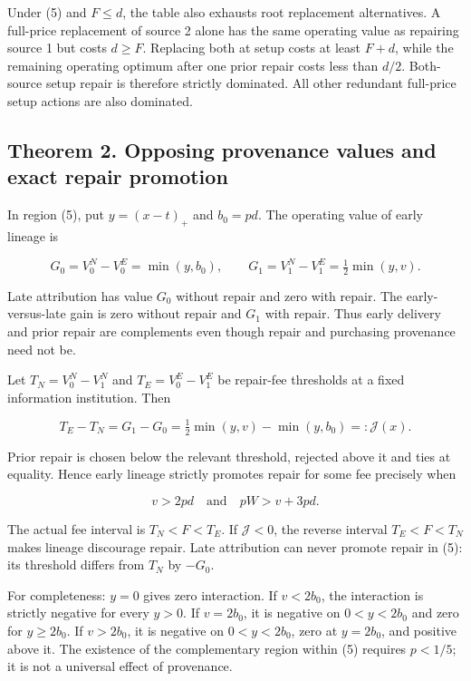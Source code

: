 \documentclass[
  11pt,
  a4paper,
]{article}
\begin{document}
Under (5) and \(F\leq d\), the table also exhausts root replacement
alternatives. A full-price replacement of source 2 alone has the same
operating value as repairing source 1 but costs \(d\geq F\). Replacing
both at setup costs at least \(F+d\), while the remaining operating
optimum after one prior repair costs less than \(d/2\). Both-source
setup repair is therefore strictly dominated. All other redundant
full-price setup actions are also dominated.

\subsection{Theorem 2. Opposing provenance values and exact repair
promotion}\label{theorem-2.-opposing-provenance-values-and-exact-repair-promotion}

In region (5), put \(y=(x-t)_+\) and \(b_0=pd\). The operating value of
early lineage is

\[G_0=V_0^N-V_0^E=\min(y,b_0),\qquad
G_1=V_1^N-V_1^E=\tfrac12\min(y,v).\tag{6}\]

Late attribution has value \(G_0\) without repair and zero with repair.
The early-versus-late gain is zero without repair and \(G_1\) with
repair. Thus early delivery and prior repair are complements even though
repair and purchasing provenance need not be.

Let \(T_N=V_0^N-V_1^N\) and \(T_E=V_0^E-V_1^E\) be repair-fee thresholds
at a fixed information institution. Then

\[T_E-T_N=G_1-G_0
=\tfrac12\min(y,v)-\min(y,b_0)=:\mathcal J(x).\tag{7}\]

Prior repair is chosen below the relevant threshold, rejected above it
and ties at equality. Hence early lineage strictly promotes repair for
some fee precisely when

\[v>2pd\quad\text{and}\quad pW>v+3pd.\tag{8}\]

The actual fee interval is \(T_N<F<T_E\). If \(\mathcal J<0\), the
reverse interval \(T_E<F<T_N\) makes lineage discourage repair. Late
attribution can never promote repair in (5): its threshold differs from
\(T_N\) by \(-G_0\).

For completeness: \(y=0\) gives zero interaction. If \(v<2b_0\), the
interaction is strictly negative for every \(y>0\). If \(v=2b_0\), it is
negative on \(0<y<2b_0\) and zero for \(y\geq2b_0\). If \(v>2b_0\), it
is negative on \(0<y<2b_0\), zero at \(y=2b_0\), and positive above it.
The existence of the complementary region within (5) requires \(p<1/5\);
it is not a universal effect of provenance.
\end{document}
